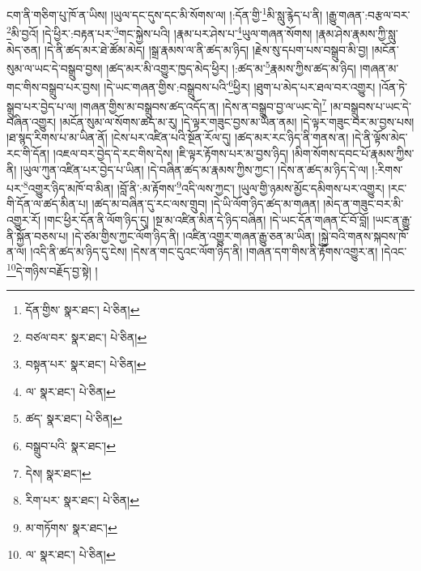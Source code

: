 ངག་ནི་གཅིག་པུ་ཁོ་ན་ཡིས། །ཡུལ་དང་དུས་དང་མི་སོགས་ལ། །:དོན་གྱི་\footnote{དོན་གྱིས་  སྣར་ཐང་།  པེ་ཅིན། }མི་སླུ་རྙེད་པ་ནི། །རྒྱུ་གཞན་:བརྩལ་བར་\footnote{བཙལ་བར་  སྣར་ཐང་།  པེ་ཅིན། }མི་བྱའོ། །དེ་ཕྱིར་:བརྟན་པར་\footnote{བསྟན་པར་  སྣར་ཐང་།  པེ་ཅིན། }གང་སྐྱེས་པའི། །རྣམ་པར་ཤེས་པ་\footnote{ལ་  སྣར་ཐང་།  པེ་ཅིན། }ཡུལ་གཞན་སོགས། །རྣམ་ཤེས་རྣམས་ཀྱི་སླུ་མེད་ཅན། །དེ་ནི་ཚད་མར་ཐེ་ཚོམ་མེད། །སྒྲ་རྣམས་ལ་ནི་ཚད་མ་ཉིད། །རྗེས་སུ་དཔག་པས་བསྒྲུབ་མི་བྱ། །མངོན་སུམ་ལ་ཡང་དེ་བསྒྲུབ་བྱས། །ཚད་མར་མི་འགྱུར་ཁྱད་མེད་ཕྱིར། །:ཚད་མ་\footnote{ཚད་  སྣར་ཐང་།  པེ་ཅིན། }རྣམས་ཀྱིས་ཚད་མ་ཉིད། །གཞན་མ་གང་གིས་བསྒྲུབ་པར་བྱས། །དེ་ཡང་གཞན་གྱིས་:བསྒྲུབས་པའི་\footnote{བསྒྲུབ་པའི་  སྣར་ཐང་། }ཕྱིར། །ཐུག་པ་མེད་པར་ཐལ་བར་འགྱུར། །འོན་ཏེ་སྒྲུབ་པར་བྱེད་པ་ལ། །གཞན་གྱིས་མ་བསྒྲུབས་ཚད་འདོད་ན། །དེས་ན་བསྒྲུབ་བྱ་ལ་ཡང་དེ།\footnote{དེས།  སྣར་ཐང་། } །མ་བསྒྲུབས་པ་ཡང་དེ་བཞིན་འགྱུར། །མངོན་སུམ་ལ་སོགས་ཚད་མ་རུ། །དེ་ལྟར་གཟུང་བྱས་མ་ཡིན་ནམ། །དེ་ལྟར་གཟུང་བར་མ་བྱས་པས། །ཐ་སྙད་རིགས་པ་མ་ཡིན་ནོ། །ངེས་པར་འཛིན་པའི་སྔོན་རོལ་དུ། །ཚད་མར་རང་ཉིད་ནི་གནས་ན། །དེ་ནི་ལྟོས་མེད་རང་གི་དོན། །འཇལ་བར་བྱེད་དེ་རང་གིས་དེས། །ཇི་ལྟར་རྟོགས་པར་མ་བྱས་ཉིད། །མིག་སོགས་དབང་པོ་རྣམས་ཀྱིས་ནི། །ཡུལ་ཀུན་འཛིན་པར་བྱེད་པ་ཡིན། །དེ་བཞིན་ཚད་མ་རྣམས་ཀྱིས་ཀྱང་། །དེས་ན་ཚད་མ་ཉིད་དེ་ལ། །:རིགས་པར་\footnote{རིག་པར་  སྣར་ཐང་།  པེ་ཅིན། }འགྱུར་ཉིད་མཁོ་བ་མིན། །བློ་ནི་:མ་རྟོགས་\footnote{མ་གཏོགས་  སྣར་ཐང་། }འདི་ལས་ཀྱང་། །ཡུལ་གྱི་ཉམས་མྱོང་དམིགས་པར་འགྱུར། །རང་གི་དོན་ལ་ཚད་མིན་པ། །ཚད་མ་བཞིན་དུ་རང་ལས་གྲུབ། །དེ་ཡི་ལོག་ཉིད་ཚད་མ་གཞན། །མེད་ན་གཟུང་བར་མི་འགྱུར་རོ། །གང་ཕྱིར་དོན་ནི་ལོག་ཉིད་དུ། །སྔ་མ་འཛིན་མིན་དེ་ཉིད་བཞིན། །དེ་ཡང་དོན་གཞན་ངོ་བོ་བློ། །ཡང་ན་རྒྱུ་ནི་སྐྱོན་བཅས་པ། །དེ་ཙམ་གྱིས་ཀྱང་ལོག་ཉིད་ནི། །འཛིན་འགྱུར་གཞན་རྒྱུ་ཅན་མ་ཡིན། །སྐྱེ་བའི་གནས་སྐབས་ཁོ་ན་ལ། །འདི་ནི་ཚད་མ་ཉིད་དུ་ངེས། །དེས་ན་གང་དུའང་ལོག་ཉིད་ནི། །གཞན་དག་གིས་ནི་རྟོགས་འགྱུར་ན། །དེའང་\footnote{ལ་  སྣར་ཐང་།  པེ་ཅིན། }དེ་གཉིས་བརྗོད་བྱ་སྟེ། །
